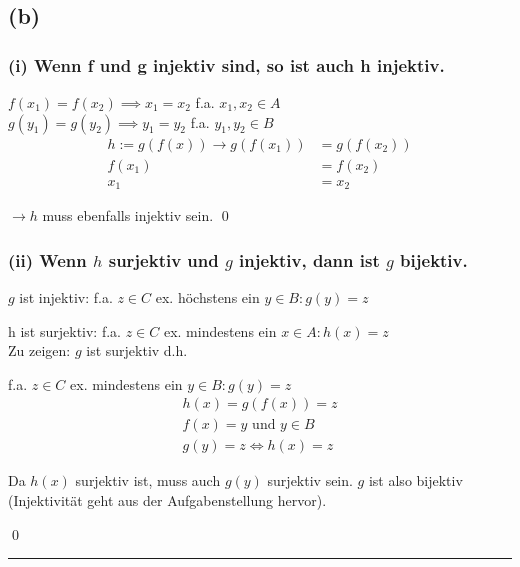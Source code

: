 \documentclass[a4paper, 11pt]{article}
\begin{document}
\subsection*{(b)}
\subsubsection*{(i) \normalfont Wenn f und g injektiv sind, so ist auch h injektiv.}


$f(x_1) = f(x_2) \implies x_1 = x_2$ \quad f.a. $x_1, x_2 \in A$ \\
$g(y_1) = g(y_2) \implies y_1 = y_2$ \quad f.a. $y_1, y_2 \in B$
\begin{align}
    h := g(f(x)) \rightarrow g(f(x_1)) &= g(f(x_2)) \\
    f(x_1) &= f(x_2) \\
    x_1 &= x_2
\end{align}

$\rightarrow h$ muss ebenfalls injektiv sein. \hfill \qed



\subsubsection*{(ii) \normalfont Wenn $h$ surjektiv und $g$ injektiv, dann ist $g$ bijektiv.}

$g$ ist injektiv: f.a. $z \in C$ ex. höchstens ein $y \in B : g(y) = z$

\noindent h ist surjektiv: f.a. $z \in C$ ex. mindestens ein $x \in A : h(x) = z$ \\

\noindent Zu zeigen: $g$ ist surjektiv d.h.

\noindent f.a. $z \in C$ ex. mindestens ein $y \in B : g(y) = z$
\setcounter{equation}{0}
\begin{align}
    h(x) = g(f(x)) = z \\
    f(x) = y \text{ und } y \in B \\
    g(y) = z \iff h(x) = z
\end{align}

\noindent Da $h(x)$ surjektiv ist, muss auch $g(y)$ surjektiv sein. $g$ ist also bijektiv (Injektivität geht aus der Aufgabenstellung hervor).



\hfill \qed
\vspace{0.5cm}
\hrule
\end{document}
